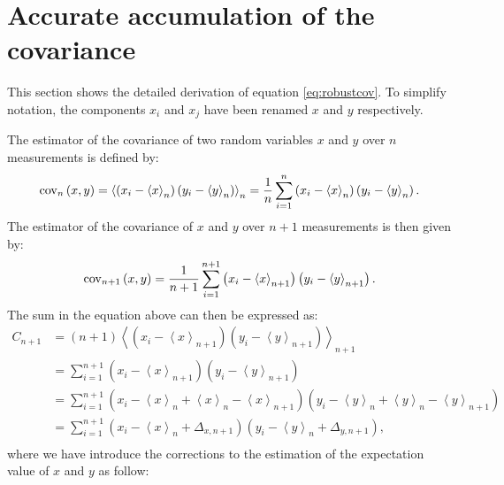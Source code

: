 \documentclass[twoside]{book}
\begin{document}
\section{Accurate accumulation of the covariance}
\label{sec:robustcov} This section shows the detailed derivation
of equation \ref{eq:robustcov}. To simplify notation, the
components $x_i$ and $x_j$ have been renamed $x$ and $y$
respectively.

The estimator of the covariance of two random variables $x$ and
$y$ over $n$ measurements is defined by:
\begin{equation}
 {\mathop{\rm cov}}_n\left(x,y\right)=\left\langle \left(x_i-\left\langle
   x\right\rangle_n\right)\left(y_i-\left\langle
   y\right\rangle_n\right)
 \right\rangle_n
   ={1\over n}\sum_{i=1}^n \left(x_i-\left\langle
   x\right\rangle_n\right)\left(y_i-\left\langle
   y\right\rangle_n\right).
\end{equation}
The estimator of the covariance of $x$ and $y$ over $n+1$
measurements is then given by:
\begin{equation}
 {\mathop{\rm cov}}_{n+1}\left(x,y\right)={1\over n+1}\sum_{i=1}^{n+1} \left(x_i-\left\langle
   x\right\rangle_{n+1}\right)\left(y_i-\left\langle
   y\right\rangle_{n+1}\right).
\end{equation}
The sum in the equation above can then be expressed as:
\begin{equation}
  \begin{array}{ll}
 C_{n+1}&= \left(n+1\right)\left\langle \left(x_i-\left\langle
   x\right\rangle_{n+1}\right)\left(y_i-\left\langle
   y\right\rangle_{n+1}\right)
 \right\rangle_{n+1}\\
 &=\displaystyle\sum_{i=1}^{n+1} \left(x_i-\left\langle
   x\right\rangle_{n+1}\right)\left(y_i-\left\langle
   y\right\rangle_{n+1}\right)\\
 &=\displaystyle\sum_{i=1}^{n+1} \left(x_i-\left\langle
   x\right\rangle_n + \left\langle x\right\rangle_n-\left\langle
   x\right\rangle_{n+1}\right)\left(y_i-\left\langle
   y\right\rangle_n + \left\langle y\right\rangle_n-\left\langle
   y\right\rangle_{n+1}\right)\\
 &=\displaystyle\sum_{i=1}^{n+1} \left(x_i-\left\langle
   x\right\rangle_n + \Delta_{x,n+1}\right)\left(y_i-\left\langle
   y\right\rangle_n + \Delta_{y,n+1}\right),\\
  \end{array}
\end{equation}
where we have introduce the corrections to the estimation of the
expectation value of $x$ and $y$ as follow:
\end{document}
